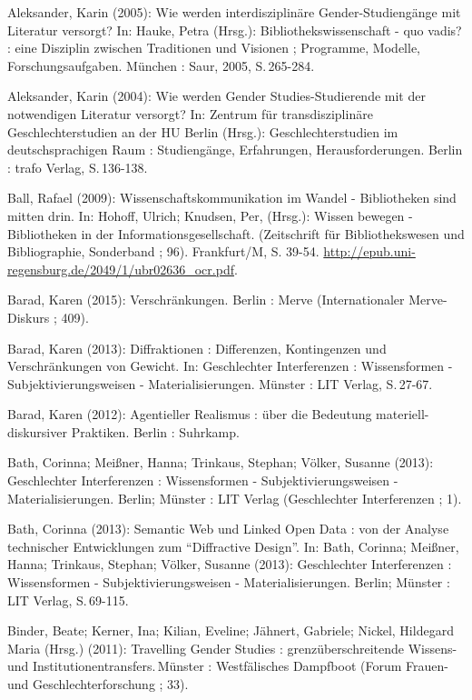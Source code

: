 Aleksander, Karin (2005): Wie werden interdisziplinäre
Gender-Studiengänge mit Literatur versorgt? In: Hauke, Petra (Hrsg.):
Bibliothekswissenschaft - quo vadis? : eine Disziplin zwischen
Traditionen und Visionen ; Programme, Modelle, Forschungsaufgaben.
München : Saur, 2005, S.\,265-284.

Aleksander, Karin (2004): Wie werden Gender Studies-Studierende mit der
notwendigen Literatur versorgt? In: Zentrum für transdisziplinäre
Geschlechterstudien an der HU Berlin (Hrsg.): Geschlechterstudien im
deutschsprachigen Raum : Studiengänge, Erfahrungen, Herausforderungen.
Berlin : trafo Verlag, S.\,136-138.

Ball, Rafael (2009): Wissenschaftskommunikation im Wandel - Bibliotheken
sind mitten drin. In: Hohoff, Ulrich; Knudsen, Per, (Hrsg.): Wissen
bewegen - Bibliotheken in der Informationsgesellschaft. (Zeitschrift für
Bibliothekswesen und Bibliographie, Sonderband ; 96). Frankfurt/M, S.
39-54. \url{http://epub.uni-regensburg.de/2049/1/ubr02636_ocr.pdf}.

Barad, Karen (2015): Verschränkungen. Berlin : Merve (Internationaler
Merve-Diskurs ; 409).

Barad, Karen (2013): Diffraktionen : Differenzen, Kontingenzen und
Verschränkungen von Gewicht. In: Geschlechter Interferenzen :
Wissensformen - Subjektivierungsweisen - Materialisierungen. Münster :
LIT Verlag, S.\,27-67.

Barad, Karen (2012): Agentieller Realismus : über die Bedeutung
materiell-diskursiver Praktiken. Berlin : Suhrkamp.

Bath, Corinna; Meißner, Hanna; Trinkaus, Stephan; Völker, Susanne
(2013): Geschlechter Interferenzen : Wissensformen -
Subjektivierungsweisen - Materialisierungen. Berlin; Münster : LIT
Verlag (Geschlechter Interferenzen ; 1).

Bath, Corinna (2013): Semantic Web und Linked Open Data : von der
Analyse technischer Entwicklungen zum \enquote{Diffractive Design}. In:
Bath, Corinna; Meißner, Hanna; Trinkaus, Stephan; Völker, Susanne
(2013): Geschlechter Interferenzen : Wissensformen -
Subjektivierungsweisen - Materialisierungen. Berlin; Münster : LIT
Verlag, S.\,69-115.

Binder, Beate; Kerner, Ina; Kilian, Eveline; Jähnert, Gabriele; Nickel,
Hildegard Maria (Hrsg.) (2011): Travelling Gender Studies :
grenzüberschreitende Wissens- und Institutionentransfers.\,Münster :
Westfälisches Dampfboot (Forum Frauen- und Geschlechterforschung ; 33).

